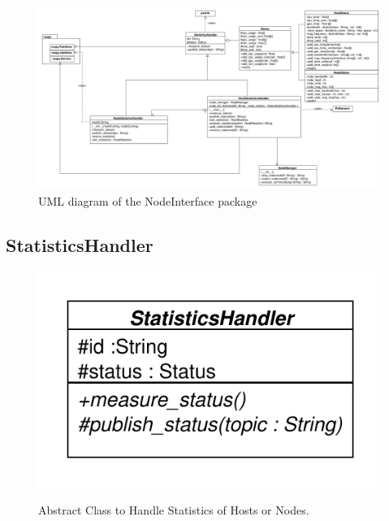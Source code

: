 
\begin{figure}[!ht]
\begin{center}
\includegraphics[width = 1.0 \linewidth]{./diagram_pictures/NodeInterface/erfassung.pdf}
\caption{UML diagram of the NodeInterface package}
\end{center}
\end{figure}
\newpage


\subsection{StatisticsHandler}
\begin{figure}[htbp]
	\begin{minipage}[t]{7cm}
		\vspace{0pt}
		\centering
		\includegraphics[scale=0.6]{./diagram_pictures/NodeInterface/StatisticsHandler.pdf}
	\end{minipage}
	\hfill
	\begin{minipage}[t]{8cm}
		\vspace{10pt}
		Abstract Class to Handle Statistics of Hosts or Nodes.
	\end{minipage}
\end{figure}




